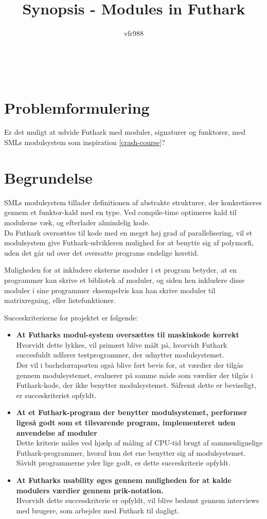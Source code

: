 \documentclass[12pt]{article}
\title{
  Synopsis - Modules in Futhark
}
\author{vfr988}
\begin{document}
\maketitle
\clearpage
\\
\section*{Problemformulering}
Er det muligt at udvide Futhark med moduler, signaturer og funktorer, med SMLs
modulsystem som inspiration \ref{crash-course}?
\\
\section*{Begrundelse}
SMLs modulsystem tillader definitionen af abstrakte strukturer, der
konkretiseres gennem et funktor-kald med en type.
Ved compile-time optimeres kald til modulerne væk, og efterlader almindelig kode.\\
Da Futhark oversættes til kode med en meget høj grad af parallelisering, vil et
modulsystem give Futhark-udvikleren mulighed for at benytte sig af polymorfi,
uden det går ud over det oversatte programs endelige køretid.

Muligheden for at inkludere eksterne moduler i et program betyder, at en
programmør kan skrive et bibliotek af moduler, og siden hen inkludere disse
moduler i sine programmer \emph eksempelvis kan han skrive moduler til
matrixregning, eller listefunktioner.

Succeskriterierne for projektet er følgende:
\begin{itemize}
\item \textbf{At Futharks modul-system oversættes til maskinkode korrekt} \\
  Hvorvidt dette lykkes, vil primært blive målt på, hvorvidt Futhark succesfuldt udfører testprogrammer, der udnytter modulsystemet. \\ Der vil i bachelorraporten også blive ført bevis for, at værdier der tilgås gennem modulsystemet, evaluerer på samme måde som værdier der tilgås i Futhark-kode, der ikke benytter modulsystemet. Såfremt dette er beviseligt, er succeskriteriet opfyldt.
\item \textbf{At et Futhark-program der benytter modulsystemet, performer ligeså godt
  som et tilsvarende program, implementeret uden anvendelse af moduler} \\
  Dette kriterie måles ved hjælp af måling af CPU-tid brugt af sammenlignelige Futhark-programmer, hvoraf kun det ene benytter sig af modulsystemet. Såvidt programmerne yder lige godt, er dette succeskriterie opfyldt.
\item \textbf{At Futharks usability øges gennem muligheden for at kalde modulers værdier
  gennem prik-notation.}\\
  Hvorvidt dette successkriterie er opfyldt, vil blive bedømt gennem interviews med brugere, som arbejder med Futhark til dagligt.
\end{itemize}
\end{document}
